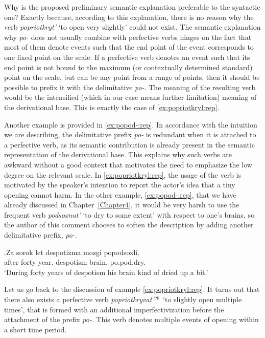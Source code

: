 Why is the proposed preliminary semantic explanation preferable to the syntactic one? Exactly because, according to this explanation, there is no reason why the verb \textit{popriotkryt'} `to open very slightly' could not exist. The semantic explanation why \textit{po-} does not usually combine with perfective verbs hinges on the fact that most of them denote events such that the end point of the event corresponds to one fixed point on the scale. If a perfective verb denotes an event such that its end point is not bound to the maximum (or contextually determined standard) point on the scale, but can be any point from a range of points, then it should be possible to prefix it with the delimitative \textit{po-}. The meaning of the resulting verb would be the intensified (which in our case means further limitation) meaning of the derivational base. This is exactly the case of \ref{ex:popriotkryl:rep}.

Another example is provided in \ref{ex:popod-:rep}. In accordance with the intuition we are describing, the delimitative prefix \textit{po-} is redundant when it is attached to a perfective verb, as its semantic contribution is already present in the semantic representation of the derivational base. This explains why such verbs are awkward without a good context that motivates the need to emphasize the low degree on the relevant scale. In \ref{ex:popriotkryl:rep}, the usage of the verb is motivated by the speaker's intention to report the actor's idea that a tiny opening cannot harm. In the other example, \ref{ex:popod-:rep}, that we have already discussed in Chapter~\ref{Chapter4}, it would be very harsh to use the frequent verb \textit{podsoxnut'} `to dry to some extent' with respect to one's brains, so the author of this comment chooses to soften the description by adding another delimitative prefix, \textit{po-}. 

\exg.\label{ex:popod-:rep}Za sorok let despotizma mozgi popodsoxli.\\
after forty year. despotism brain. po.pod.dry.\\
\trans `During forty years of despotism his brain kind of dried up a bit.'\\

Let us go back to the discussion of example \ref{ex:popriotkryl:rep}. It turns out that there also exists a perfective verb \textit{popriotkryvat'}$^{\textsc{pf}}$ `to slightly open multiple times', that is formed with an additional imperfectivization before the attachment of the prefix \textit{po-}. This verb denotes multiple events of opening within a short time period. 

